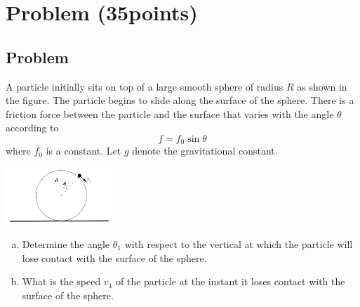 \documentclass[solutions]{esg8012exam}
\begin{document}
\section{Problem \thesection\space(35\space points)}
\subsection{Problem}
  A particle initially sits on top of a large smooth sphere of radius $R$ as shown in the figure. The particle begins to slide along the surface of the sphere. There is a friction force between the particle and the surface that varies with the angle $\theta$ according to
  $$f = f_0\sin\theta$$
  where $f_0$ is a constant. Let $g$ denote the gravitational constant.
  \begin{center}\includegraphics[width=0.3\textwidth]{exam2_p2_1}\end{center}
  \begin{enumerate}[(a)]
    \item Determine the angle $\theta_1$ with respect to the vertical at which the particle will lose contact with the surface of the sphere.
    \item What is the speed $v_1$ of the particle at the instant it loses contact with the surface of the sphere.
  \end{enumerate}
\end{document}
